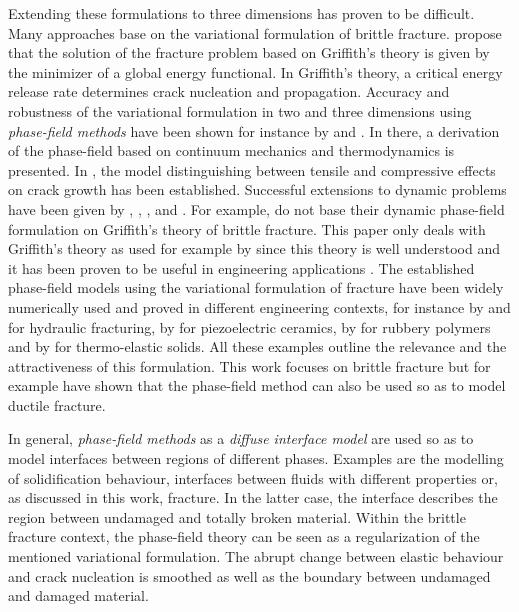 Extending these formulations to three dimensions has proven to be difficult. Many approaches base on the variational formulation of brittle fracture. \citet{02_B_VarBrittle} propose that the solution of the fracture problem based on Griffith's theory is given by the minimizer of a global energy functional. In Griffith's theory, a critical energy release rate determines crack nucleation and propagation. Accuracy and robustness of the variational formulation in two and three dimensions using \textit{phase-field methods} have been shown for instance by \citet{04_B_VarBrittleProve2} and \citet{03_B_VarBrittleProve1}. In there, a derivation of the phase-field based on continuum mechanics and thermodynamics is presented. In \cite{04_B_VarBrittleProve2}, the model distinguishing between tensile and compressive effects on crack growth has been established. Successful extensions to dynamic problems have been given by \citet{01_PF_dyn_brittle}, \citet{05_B_dynExtension1}, \citet{06_B_dynExtension2}, \citet{07_B_dynExtension3} and \citet{08_B_dynExtension4}. For example, \citet{10_PH_Mode3} do not base their dynamic phase-field formulation on Griffith's theory of brittle fracture. This paper only deals with Griffith's theory as used for example by \citet{08_PF_Gammac2} since this theory is well understood and it has been proven to be useful in engineering applications \citep{01_PF_dyn_brittle}. The established phase-field models using the variational formulation of fracture have been widely numerically used and proved in different engineering contexts, for instance by \citet{11_B_EngProb1} and \citet{12_B_EngProb2} for hydraulic fracturing, by \citet{13_B_EngProb3} for piezoelectric ceramics, by \citet{14_B_EngProb4} for rubbery polymers and by \citet{15_B_EngProb5} for thermo-elastic solids. All these examples outline the relevance and the attractiveness of this formulation. This work focuses on brittle fracture but for example \citet{03_PF_ductile} have shown that the phase-field method can also be used so as to model ductile fracture.

In general, \textit{phase-field methods} as a \textit{diffuse interface model} are used so as to model interfaces between regions of different phases. Examples are the modelling of solidification behaviour, interfaces between fluids with different properties or, as discussed in this work, fracture. In the latter case, the interface describes the region between undamaged and totally broken material. Within the brittle fracture context, the phase-field theory can be seen as a regularization of the mentioned variational formulation. The abrupt change between elastic behaviour and crack nucleation is smoothed as well as the boundary between undamaged and damaged material.

